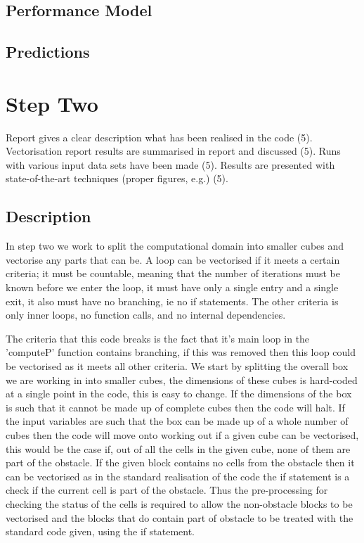 \documentclass[paper=a4, fontsize=11pt]{scrartcl}
\numberwithin{equation}{section}		%
\numberwithin{figure}{section}			%
\numberwithin{table}{section}				%
\begin{document}
\subsection{Performance Model}

\subsection{Predictions}


\section{Step Two}
Report gives a clear description what has been realised in the code (5). Vectorisation report results are summarised in report and discussed (5). Runs with various input data sets have been made (5). Results are presented with state-of-the-art techniques (proper figures, e.g.) (5).
\subsection{Description}

In step two we work to split the computational domain into smaller cubes and vectorise any parts that can be.  A loop can be vectorised if it meets a certain criteria; it must be countable, meaning that the number of iterations must be known before we enter the loop, it must have only a single entry and a  single exit, it also must have no branching, ie no if statements. The other criteria is only inner loops, no function calls, and no internal dependencies. 

The criteria that this code breaks is the fact that it's main loop in the 'computeP' function contains branching, if this was removed then this loop could be vectorised as it meets all other criteria. We start by splitting the overall box we are working in into smaller cubes, the dimensions of these cubes is hard-coded at a single point in the code, this is easy to change. If the dimensions of the box is such that it cannot be made up of complete cubes then the code will halt. If the input variables are such that the box can be made up of a whole number of cubes then the code will move onto working out if a given cube can be vectorised, this would be the case if, out of all the cells in the given cube, none of them are part of the obstacle. If the given block contains no cells from the obstacle then it can be vectorised as in the standard realisation of the code the if statement is a check if the current cell is part of the obstacle. Thus the pre-processing for checking the status of the cells is required to allow the non-obstacle blocks to be vectorised and the blocks that do contain part of obstacle to be treated with the standard code given, using the if statement.
\end{document}
